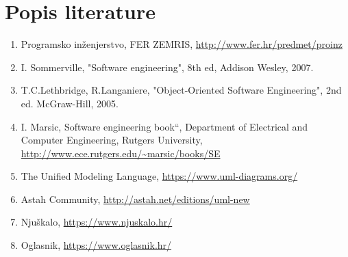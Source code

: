 \chapter*{Popis literature}
	 	
%	
%		
		
		\begin{enumerate}
			
			
			\item  Programsko inženjerstvo, FER ZEMRIS, \url{http://www.fer.hr/predmet/proinz}
			
			\item  I. Sommerville, "Software engineering", 8th ed, Addison Wesley, 2007.
			
			\item  T.C.Lethbridge, R.Langaniere, "Object-Oriented Software Engineering", 2nd ed. McGraw-Hill, 2005.
			
			\item  I. Marsic, Software engineering book``, Department of Electrical and Computer Engineering, Rutgers University, \url{http://www.ece.rutgers.edu/~marsic/books/SE}
			
			\item  The Unified Modeling Language, \url{https://www.uml-diagrams.org/}
			
			\item  Astah Community, \url{http://astah.net/editions/uml-new}
			
			\item Njuškalo, \url{https://www.njuskalo.hr/}
			
			\item Oglasnik, \url{https://www.oglasnik.hr/}
		\end{enumerate}
		
		 